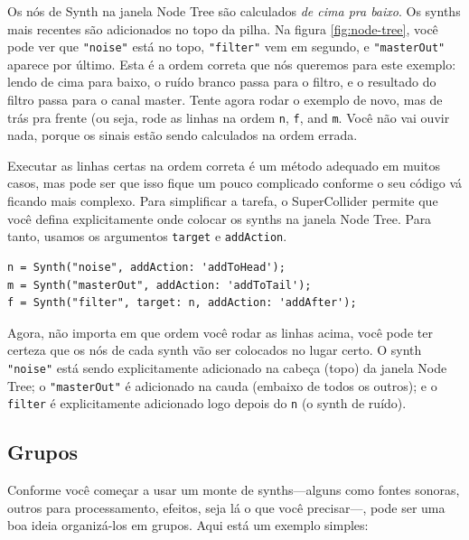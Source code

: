Os nós de Synth na janela Node Tree são calculados \emph{de cima pra baixo}. Os synths mais recentes são adicionados no topo da pilha. Na figura \ref{fig:node-tree}, você pode ver que \texttt{"noise"} está no topo, \texttt{"filter"} vem em segundo, e \texttt{"masterOut"} aparece por último. Esta é a ordem correta que nós queremos para este exemplo: lendo de cima para baixo, o ruído branco passa para o filtro, e o resultado do filtro passa para o canal master. Tente agora rodar o exemplo de novo, mas de trás pra frente (ou seja, rode as linhas na ordem \texttt{n}, \texttt{f}, and \texttt{m}. Você não vai ouvir nada, porque os sinais estão sendo calculados na ordem errada.

Executar as linhas certas na ordem correta é um método adequado em muitos casos, mas pode ser que isso fique um pouco complicado conforme o seu código vá ficando mais complexo. Para simplificar a tarefa, o SuperCollider permite que você defina explicitamente onde colocar os synths na janela Node Tree. Para tanto, usamos os argumentos \texttt{target} e \texttt{addAction}.

\begin{lstlisting}[style=SuperCollider-IDE, basicstyle=\scttfamily\footnotesize]
n = Synth("noise", addAction: 'addToHead');
m = Synth("masterOut", addAction: 'addToTail');
f = Synth("filter", target: n, addAction: 'addAfter');
\end{lstlisting}

Agora, não importa em que ordem você rodar as linhas acima, você pode ter certeza que os nós de cada synth vão ser colocados no lugar certo. O synth \texttt{"noise"} está sendo explicitamente adicionado na cabeça (topo) da janela Node Tree; o \texttt{"masterOut"} é adicionado na cauda (embaixo de todos os outros); e o \texttt{filter} é explicitamente adicionado logo depois do \texttt{n} (o synth de ruído).

\subsection{Grupos}

Conforme você começar a usar um monte de synths---alguns como fontes sonoras, outros para processamento, efeitos, seja lá o que você precisar---, pode ser uma boa ideia organizá-los em grupos. Aqui está um exemplo simples:

